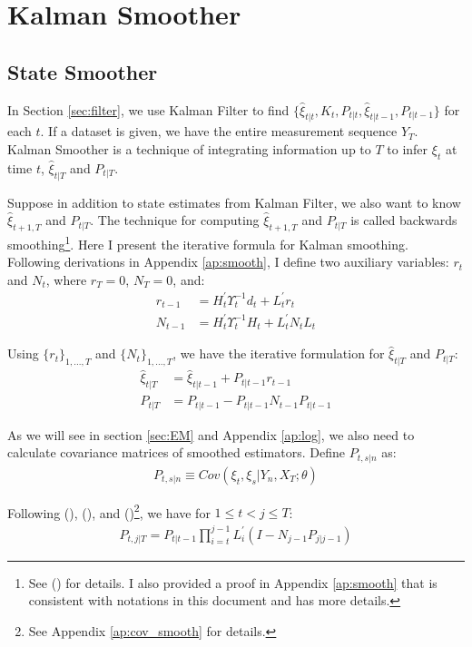 \documentclass[12pt]{article}
\numberwithin{equation}{section}
\begin{document}
\section{Kalman Smoother} \label{sec:smoother}
\subsection{State Smoother}
In Section \ref{sec:filter}, we use Kalman Filter to find $\{\hat{\xi}_{t|t}, K_t, P_{t|t}, \hat{\xi}_{t|t-1}, P_{t|t-1}\}$ for each $t$. If a dataset is given, we have the entire measurement sequence $Y_T$. Kalman Smoother is a technique of integrating information up to $T$ to infer $\xi_t$ at time $t$, $\hat{\xi}_{t|T}$ and $P_{t|T}$. 

Suppose in addition to state estimates from Kalman Filter, we also want to know $\hat{\xi}_{t+1,T}$ and $P_{t|T}$. The technique for computing $\hat{\xi}_{t+1,T}$ and $P_{t|T}$ is called backwards smoothing\footnote{See (\cite{dejong_1989}) for details. I also provided a proof in Appendix \ref{ap:smooth} that is consistent with notations in this document and has more details.}. Here I present the iterative formula for Kalman smoothing. Following derivations in Appendix \ref{ap:smooth}, I define two auxiliary variables: $r_{t}$ and $N_{t}$, where $r_T=0$, $N_T=0$, and:
\begin{align}
    r_{t-1} &= H_t^{'}\Upsilon_t^{-1}d_t + L_t^{'}r_t \label{eq:r1t} \\
    N_{t-1} &= H_t^{'}\Upsilon_t^{-1}H_t + L_t^{'}N_tL_t \label{eq:N1t}
\end{align}

Using $\{r_t\}_{1,...,T}$ and $\{N_t\}_{1,...,T}$, we have the iterative formulation for $\hat{\xi}_{t|T}$ and $P_{t|T}$:
\begin{align}
    \hat{\xi}_{t|T} &= \hat{\xi}_{t|t-1} + P_{t|t-1}r_{t-1} \label{eq:smooth_state2} \\
    P_{t|T} &= P_{t|t-1}- P_{t|t-1}N_{t-1}P_{t|t-1} \label{eq:smooth_P2}
\end{align}

As we will see in section \ref{sec:EM} and Appendix \ref{ap:log}, we also need to calculate covariance matrices of smoothed estimators. Define $P_{t,s|n}$ as:
\begin{align*}
    P_{t,s|n}\equiv Cov(\xi_t,\xi_{s}|Y_n,X_T;\theta)
\end{align*}

Following (\cite{koopman_1992}), (\cite{dejong_1988}), and (\cite{dejong_1989})\footnote{See Appendix \ref{ap:cov_smooth} for details.}, we have for $1\leq t < j \leq T$:
\begin{align*}
    P_{t,j|T} = P_{t|t-1}\prod_{i=t}^{j-1}L_i^{'}(I-N_{j-1}P_{j|j-1}) 
\end{align*}
\end{document}

